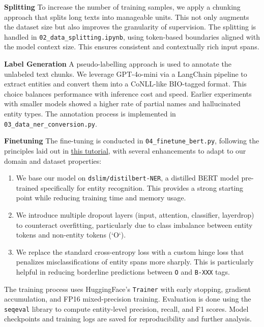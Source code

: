 \begin{list}{}{}
    \item[\textbf{Splitting}] To increase the number of training samples, we apply a chunking approach that splits long texts into manageable units. This not only augments the dataset size but also improves the granularity of supervision. The splitting is handled in \texttt{02\_data\_splitting.ipynb}, using token-based boundaries aligned with the model context size. This ensures consistent and contextually rich input spans.

    \item[\textbf{Label Generation}] A pseudo-labelling approach is used to annotate the unlabeled text chunks. We leverage GPT-4o-mini via a LangChain pipeline to extract entities and convert them into a CoNLL-like BIO-tagged format. This choice balances performance with inference cost and speed. Earlier experiments with smaller models showed a higher rate of partial names and hallucinated entity types. The annotation process is implemented in \texttt{03\_data\_ner\_conversion.py}.

    \item[\textbf{Finetuning}] The fine-tuning is conducted in \texttt{04\_finetune\_bert.py}, following the principles laid out in \href{https://medium.com/@whyamit101/fine-tuning-bert-for-named-entity-recognition-ner-b42bcf55b51d}{this tutorial}, with several enhancements to adapt to our domain and dataset properties:
    \begin{enumerate}
        \item We base our model on \texttt{dslim/distilbert-NER}, a distilled BERT model pre-trained specifically for entity recognition. This provides a strong starting point while reducing training time and memory usage.
        \item We introduce multiple dropout layers (input, attention, classifier, layerdrop) to counteract overfitting, particularly due to class imbalance between entity tokens and non-entity tokens (`O`).
        \item We replace the standard cross-entropy loss with a custom hinge loss that penalizes misclassifications of entity spans more sharply. This is particularly helpful in reducing borderline predictions between \texttt{O} and \texttt{B-XXX} tags.
    \end{enumerate}

    The training process uses HuggingFace’s \texttt{Trainer} with early stopping, gradient accumulation, and FP16 mixed-precision training. Evaluation is done using the \texttt{seqeval} library to compute entity-level precision, recall, and F1 scores. Model checkpoints and training logs are saved for reproducibility and further analysis.
\end{list}

